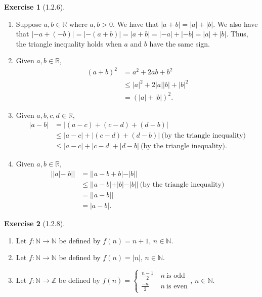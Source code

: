 \documentclass{amsart}
\theoremstyle{definition}
\newtheorem{exercise}{Exercise}
\newcommand{\N}{\mathbb{N}}
\newcommand{\Z}{\mathbb{Z}}
\newcommand{\R}{\mathbb{R}}
\newcommand{\abs}[1]{|#1|}
\begin{document}
\begin{exercise}[1.2.6]
  \begin{enumerate}[label={(\alph*)}]
    \item Suppose $a, b \in \R$ where $a, b > 0$. We have that $\abs{a + b} =
      \abs{a} + \abs{b}$.  We also have that $\abs{-a + (-b)} = \abs{-(a + b)} =
      \abs{a + b} = \abs{-a} + \abs{-b} = \abs{a} + \abs{b}$. Thus, the triangle
      inequality holds when $a$ and $b$ have the same sign.
    \item Given $a, b \in \R$,
      \begin{align*}
        {(a + b)}^2 &= a^2 + 2ab + b^2 \\
        &\le \abs{a}^2 + 2\abs{a}\abs{b} + \abs{b}^2 \\
        &= {(\abs{a} + \abs{b})}^2.
      \end{align*}
    \item Given $a, b, c, d \in \R$,
      \begin{align*}
        \abs{a - b} &= \abs{(a - c) + (c - d) + (d - b)} \\
        &\le \abs{a - c} + \abs{(c - d) + (d - b)}\ \text{(by the triangle
        inequality)} \\
        &\le \abs{a - c} + \abs{c - d} + \abs{d - b}\ \text{(by the triangle
        inequality)}.
      \end{align*}
    \item Given $a, b \in \R$,
      \begin{align*}
        \abs{\abs{a} - \abs{b}} &= \abs{\abs{a - b + b} - \abs{b}} \\
        &\le \abs{\abs{a - b} + \abs{b} - \abs{b}}\ \text{(by the triangle
        inequality)} \\
        &= \abs{\abs{a - b}} \\
        &= \abs{a - b}.
      \end{align*}
  \end{enumerate}
\end{exercise}

\begin{exercise}[1.2.8]
  \begin{enumerate}[label={(\alph*)}]
    \item Let $f : \N \rightarrow \N$ be defined by $f(n) = n + 1$, $n \in \N$.
    \item Let $f : \N \rightarrow \N$ be defined by $f(n) = \abs{n}$, $n \in \N$.
    \item Let $f : \N \rightarrow \Z$ be defined by $f(n) =
      \begin{cases}
        \frac{n - 1}{2} &\, n\ \text{is odd} \\
        \frac{-n}{2} &\, n\ \text{is even}
      \end{cases}$,
      $n \in \N$.
  \end{enumerate}
\end{exercise}
\end{document}

